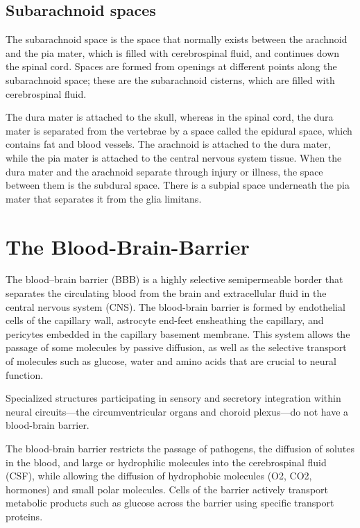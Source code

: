 \hypertarget{subarachnoid-spaces}{%
\subsection{Subarachnoid spaces}\label{subarachnoid-spaces}}

The subarachnoid space is the space that normally exists between the arachnoid and the pia mater, which is filled with cerebrospinal fluid, and continues down the spinal cord. Spaces are formed from openings at different points along the subarachnoid space; these are the subarachnoid cisterns, which are filled with cerebrospinal fluid.

The dura mater is attached to the skull, whereas in the spinal cord, the dura mater is separated from the vertebrae by a space called the epidural space, which contains fat and blood vessels. The arachnoid is attached to the dura mater, while the pia mater is attached to the central nervous system tissue. When the dura mater and the arachnoid separate through injury or illness, the space between them is the subdural space. There is a subpial space underneath the pia mater that separates it from the glia limitans.

\hypertarget{the-blood-brain-barrier}{%
\section{The Blood-Brain-Barrier}\label{the-blood-brain-barrier}}

The blood--brain barrier (BBB) is a highly selective semipermeable border that separates the circulating blood from the brain and extracellular fluid in the central nervous system (CNS). The blood-brain barrier is formed by endothelial cells of the capillary wall, astrocyte end-feet ensheathing the capillary, and pericytes embedded in the capillary basement membrane. This system allows the passage of some molecules by passive diffusion, as well as the selective transport of molecules such as glucose, water and amino acids that are crucial to neural function.

Specialized structures participating in sensory and secretory integration within neural circuits---the circumventricular organs and choroid plexus---do not have a blood-brain barrier.

The blood-brain barrier restricts the passage of pathogens, the diffusion of solutes in the blood, and large or hydrophilic molecules into the cerebrospinal fluid (CSF), while allowing the diffusion of hydrophobic molecules (O2, CO2, hormones) and small polar molecules. Cells of the barrier actively transport metabolic products such as glucose across the barrier using specific transport proteins.

